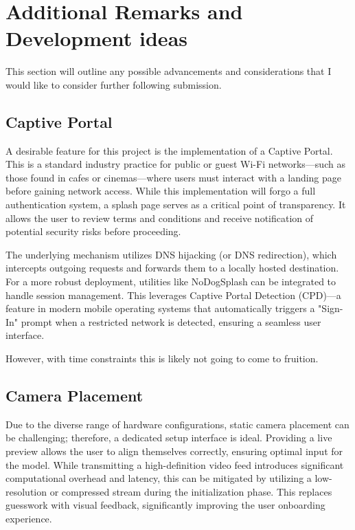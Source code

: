 \chapter*{Additional Remarks and Development ideas}

This section will outline any possible advancements and considerations that I would like to consider further following submission.

\section{Captive Portal}
A desirable feature for this project is the implementation of a Captive Portal. This is a standard industry practice for public
or guest Wi-Fi networks—such as those found in cafes or cinemas—where users must interact with a landing page before gaining
network access. While this implementation will forgo a full authentication system, a splash page serves as a critical point of
transparency. It allows the user to review terms and conditions and receive notification of potential security risks before proceeding.

The underlying mechanism utilizes DNS hijacking (or DNS redirection), which intercepts outgoing requests and forwards them to
a locally hosted destination. For a more robust deployment, utilities like NoDogSplash can be integrated to handle session management.
This leverages Captive Portal Detection (CPD)—a feature in modern mobile operating systems that automatically triggers a "Sign-In"
prompt when a restricted network is detected, ensuring a seamless user interface.

However, with time constraints this is likely not going to come to fruition.




\section{Camera Placement}
Due to the diverse range of hardware configurations, static camera placement can be challenging; therefore, a dedicated setup
interface is ideal. Providing a live preview allows the user to align themselves correctly, ensuring optimal input for the model.
While transmitting a high-definition video feed introduces significant computational overhead and latency, this can be mitigated
by utilizing a low-resolution or compressed stream during the initialization phase. This replaces guesswork with visual feedback,
significantly improving the user onboarding experience.




